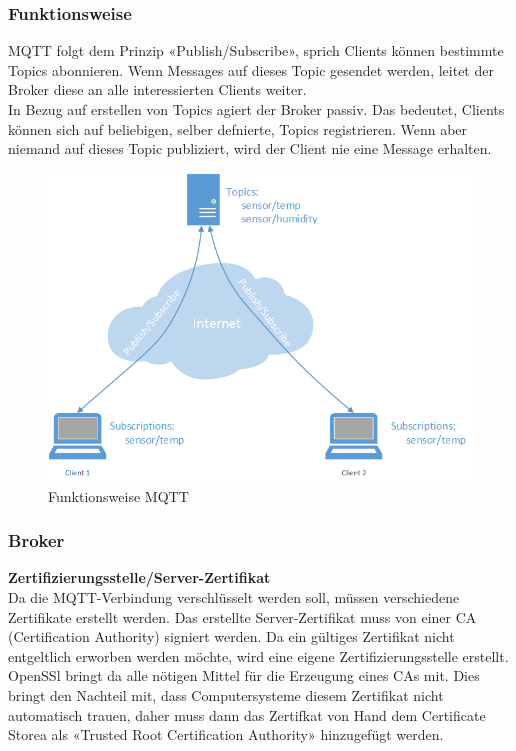 \subsubsection{Funktionsweise}
MQTT folgt dem Prinzip «Publish/Subscribe», sprich Clients können bestimmte Topics abonnieren. Wenn Messages auf dieses Topic gesendet werden, leitet der Broker diese an alle interessierten Clients weiter. \\
In Bezug auf erstellen von Topics agiert der Broker passiv. Das bedeutet, Clients können sich auf beliebigen, selber defnierte, Topics registrieren. Wenn aber niemand auf dieses Topic publiziert, wird der Client nie eine Message erhalten.

\begin{figure}[h!]
	\centering
		\includegraphics[scale=0.6]{report/img/mqttFunktionsweise}
	\caption{Funktionsweise MQTT}
	\label{fig:deploymentAzure}
\end{figure}

\subsubsection{Broker}

\textbf{Zertifizierungsstelle/Server-Zertifikat} \\
Da die MQTT-Verbindung verschlüsselt werden soll, müssen verschiedene Zertifikate erstellt werden. Das erstellte Server-Zertifikat muss von einer CA (Certification Authority) signiert werden. Da ein gültiges Zertifikat nicht entgeltlich erworben werden möchte, wird eine eigene Zertifizierungsstelle erstellt. OpenSSl bringt da alle nötigen Mittel für die Erzeugung eines CAs mit. Dies bringt den Nachteil mit, dass Computersysteme diesem Zertifikat nicht automatisch trauen, daher muss dann das Zertifkat von Hand dem Certificate Storea als «Trusted Root Certification Authority» hinzugefügt werden. \\

